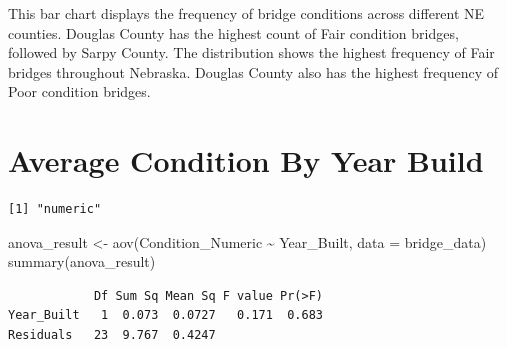 \documentclass[
  letterpaper,
  DIV=11,
  numbers=noendperiod]{scrreprt}
\newenvironment{Shaded}{\begin{snugshade}}{\end{snugshade}}
\newcommand{\AttributeTok}[1]{\textcolor[rgb]{0.40,0.45,0.13}{#1}}
\newcommand{\FunctionTok}[1]{\textcolor[rgb]{0.28,0.35,0.67}{#1}}
\newcommand{\NormalTok}[1]{\textcolor[rgb]{0.00,0.23,0.31}{#1}}
\newcommand{\OtherTok}[1]{\textcolor[rgb]{0.00,0.23,0.31}{#1}}
\newcommand{\SpecialCharTok}[1]{\textcolor[rgb]{0.37,0.37,0.37}{#1}}
\begin{document}
This bar chart displays the frequency of bridge conditions across
different NE counties. Douglas County has the highest count of Fair
condition bridges, followed by Sarpy County. The distribution shows the
highest frequency of Fair bridges throughout Nebraska. Douglas County
also has the highest frequency of Poor condition bridges.

\section{Average Condition By Year
Build}\label{average-condition-by-year-build-1}

\begin{Shaded}
\end{Shaded}

\begin{verbatim}
[1] "numeric"
\end{verbatim}

\begin{Shaded}
\begin{Highlighting}[]
\NormalTok{anova\_result }\OtherTok{\textless{}{-}} \FunctionTok{aov}\NormalTok{(Condition\_Numeric }\SpecialCharTok{\textasciitilde{}}\NormalTok{ Year\_Built, }\AttributeTok{data =}\NormalTok{ bridge\_data)}
\FunctionTok{summary}\NormalTok{(anova\_result)}
\end{Highlighting}
\end{Shaded}

\begin{verbatim}
            Df Sum Sq Mean Sq F value Pr(>F)
Year_Built   1  0.073  0.0727   0.171  0.683
Residuals   23  9.767  0.4247               
\end{verbatim}
\end{document}
